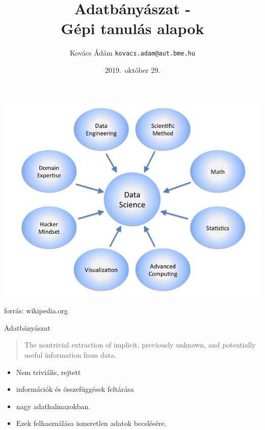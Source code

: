 \documentclass[bigger]{beamer}
\title{Adatbányászat - \\ Gépi tanulás alapok}
\date[]{2019.~október 29.}
\author[Kovács Ádám]{Kovács Ádám \texttt{kovacs.adam@aut.bme.hu}}
\begin{document}
\begin{frame}
\titlepage
\end{frame}

\begin{frame}
    \begin{center}
\includegraphics[width=.8\textwidth]{fig/data_science}
    \end{center}
    \footnotesize{forrás: wikipedia.org}
\end{frame}

\begin{frame}{Adatbányászat}
    \begin{quote}
        The nontrivial extraction of implicit, previously
    unknown, and potentially useful information
    from data.
    \end{quote}
    \begin{itemize}
        \item Nem triviális, rejtett
        \item információk és összefüggések feltárása
        \item nagy adathalmazokban.
        \item Ezek felhasználása ismeretlen adatok becslésére.
    \end{itemize}
\end{frame}
\end{document}
